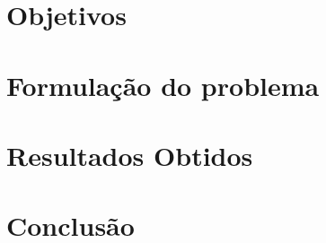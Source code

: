 \documentclass[
	12pt,				%
	openright,			%
	oneside,			%
	a4paper,			%
	english,			%
	french,				%
	spanish,			%
	brazil,				%
	]{abntex2}
\begin{document}
\tableofcontents*
\pagebreak




	


\chapter{Objetivos}

\chapter{Formulação do problema}
\chapter{Resultados Obtidos}
\chapter{Conclusão}

\cite{algo}
\cite{cardoso2005teoria}
\cite{coelho2013teoria}
\cite{costa2011teoria}
\cite{costalonga2012grafos}
\cite{deteoria}
\cite{feofiloff2011introduccao}



%
\end{document}
